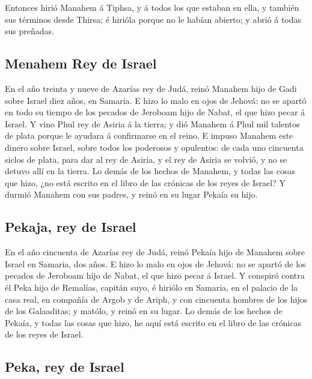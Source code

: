  Entonces hirió Manahem á Tiphsa, y á todos los que
estaban en ella, y también sus términos desde Thirsa; é hirióla porque
no le habían abierto; y abrió á todas sus preñadas.

\hypertarget{menahem-rey-de-israel}{%
\subsection{Menahem Rey de Israel}\label{menahem-rey-de-israel}}

 En el año treinta y nueve de Azarías rey de Judá, reinó
Manahem hijo de Gadi sobre Israel diez años, en Samaria. 
E hizo lo malo en ojos de Jehová: no se apartó en todo su tiempo de los
pecados de Jeroboam hijo de Nabat, el que hizo pecar á Israel.
 Y vino Phul rey de Asiria á la tierra; y dió Manahem á
Phul mil talentos de plata porque le ayudara á confirmarse en el reino.
 E impuso Manahem este dinero sobre Israel, sobre todos
los poderosos y opulentos: de cada uno cincuenta siclos de plata, para
dar al rey de Asiria, y el rey de Asiria se volvió, y no se detuvo allí
en la tierra.  Lo demás de los hechos de Manahem, y todas
las cosas que hizo, ¿no está escrito en el libro de las crónicas de los
reyes de Israel?  Y durmió Manahem con sus padres, y
reinó en su lugar Pekaía su hijo.

\hypertarget{pekaja-rey-de-israel}{%
\subsection{Pekaja, rey de Israel}\label{pekaja-rey-de-israel}}

 En el año cincuenta de Azarías rey de Judá, reinó Pekaía
hijo de Manahem sobre Israel en Samaria, dos años.  E
hizo lo malo en ojos de Jehová: no se apartó de los pecados de Jeroboam
hijo de Nabat, el que hizo pecar á Israel.  Y conspiró
contra él Peka hijo de Remalías, capitán suyo, é hiriólo en Samaria, en
el palacio de la casa real, en compañía de Argob y de Ariph, y con
cincuenta hombres de los hijos de los Galaaditas; y matólo, y reinó en
su lugar.  Lo demás de los hechos de Pekaía, y todas las
cosas que hizo, he aquí está escrito en el libro de las crónicas de los
reyes de Israel.

\hypertarget{peka-rey-de-israel}{%
\subsection{Peka, rey de Israel}\label{peka-rey-de-israel}}


